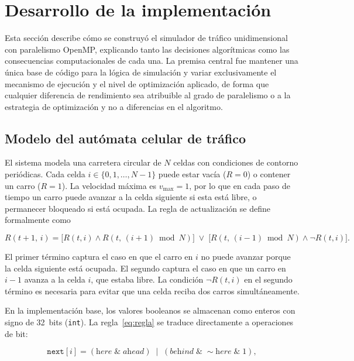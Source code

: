 \section{Desarrollo de la implementación}

Esta sección describe cómo se construyó el simulador de tráfico
unidimensional con paralelismo OpenMP, explicando tanto las decisiones
algorítmicas como las consecuencias computacionales de cada una. La
premisa central fue mantener una única base de código para la lógica de
simulación y variar exclusivamente el mecanismo de ejecución y el nivel
de optimización aplicado, de forma que cualquier diferencia de rendimiento
sea atribuible al grado de paralelismo o a la estrategia de optimización
y no a diferencias en el algoritmo.

\subsection{Modelo del autómata celular de tráfico}

El sistema modela una carretera circular de $N$ celdas con condiciones
de contorno periódicas. Cada celda $i \in \{0, 1, \ldots, N-1\}$ puede
estar vacía ($R = 0$) o contener un carro ($R = 1$). La velocidad máxima
es $v_{\max} = 1$, por lo que en cada paso de tiempo un carro puede
avanzar a la celda siguiente si esta está libre, o permanecer bloqueado si
está ocupada. La regla de actualización se define formalmente como

\begin{equation}
    R(t+1,\, i) =
    \bigl[R(t,i) \wedge R(t,\,(i+1)\bmod N)\bigr]
    \;\vee\;
    \bigl[R(t,\,(i-1)\bmod N) \wedge \neg R(t,i)\bigr].
    \label{eq:regla}
\end{equation}

El primer término captura el caso en que el carro en $i$ no puede avanzar
porque la celda siguiente está ocupada. El segundo captura el caso en que
un carro en $i-1$ avanza a la celda $i$, que estaba libre. La
condición $\neg R(t,i)$ en el segundo término es necesaria para evitar
que una celda reciba dos carros simultáneamente.

En la implementación base, los valores booleanos se almacenan como enteros
con signo de 32~bits (\texttt{int}). La regla~\eqref{eq:regla} se traduce
directamente a operaciones de bit:

\begin{equation}
    \texttt{next}[i] =
    (\textit{here} \;\&\; \textit{ahead})
    \;\mid\;
    (\textit{behind} \;\&\; \mathtt{\sim}\textit{here} \;\&\; 1),
\end{equation}

